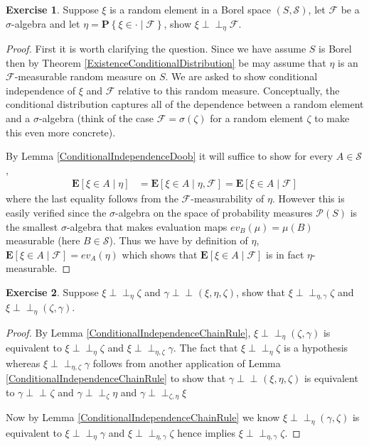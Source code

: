 \documentclass{amsbook}
\theoremstyle{definition}
\newtheorem{xca}{Exercise}
\theoremstyle{remark}
\newcommand{\Independent}{\perp \! \! \! \perp}
\newcommand{\cindependent}[3]{#1 \Independent_{#3} #2}
\newcommand{\cexpectationlong}[2]{\textbf{E}\left[ #2 \mid #1 \right]}
\newcommand{\cprobability}[2]{\textbf{P} \left \{#2 \mid #1 \right \}}
\begin{document}
\begin{xca}Suppose $\xi$ is a random element in a Borel space $(S, \mathcal{S})$, let
  $\mathcal{F}$ be a $\sigma$-algebra and let $\eta =
  \cprobability{\mathcal{F}}{\xi \in \cdot}$, show $\cindependent{\xi}{\mathcal{F}}{\eta}$.
\end{xca}
\begin{proof}
First it is worth clarifying the question.  Since we have assume $S$
is Borel then by Theorem \ref{ExistenceConditionalDistribution} be may
assume that $\eta$ is an $\mathcal{F}$-measurable random measure on
$S$.  We are asked to show conditional independence of $\xi$ and
$\mathcal{F}$ relative to this random measure.  Conceptually, the
conditional distribution captures all of the dependence between a
random element and a $\sigma$-algebra (think of the case $\mathcal{F}
= \sigma(\zeta)$ for a random element $\zeta$ to make this even more concrete).  

By Lemma \ref{ConditionalIndependenceDoob} it will suffice to show for
every $A \in \mathcal{S}$, 
\begin{align*}
\cexpectationlong{\eta}{\xi \in  A} 
&= \cexpectationlong{\eta,\mathcal{F}}{\xi \in  A} 
= \cexpectationlong{\mathcal{F}}{\xi \in  A} 
\end{align*}
where the last equality follows from the $\mathcal{F}$-measurability
of $\eta$.  However this is easily verified since the $\sigma$-algebra
on the space of probability measures $\mathcal{P}(S)$ is the smallest $\sigma$-algebra that makes
evaluation maps $ev_B(\mu) = \mu(B)$ measurable (here $B \in \mathcal{S}$).  Thus we have by
definition of $\eta$, $\cexpectationlong{\mathcal{F}}{\xi \in  A} =
ev_A(\eta)$ which shows that $\cexpectationlong{\mathcal{F}}{\xi \in
  A}$ is in fact $\eta$-measurable.
\end{proof}

\begin{xca}Suppose $\cindependent{\xi}{\zeta}{\eta}$ and
  $\cindependent{\gamma}{(\xi,\eta, \zeta)}{}$, show that
  $\cindependent{\xi}{\zeta}{\eta,\gamma}$ and $\cindependent{\xi}{(\zeta,\gamma)}{\eta}$.
\end{xca}
\begin{proof}
By Lemma \ref{ConditionalIndependenceChainRule},
$\cindependent{\xi}{(\zeta,\gamma)}{\eta}$ is equivalent to
$\cindependent{\xi}{\zeta}{\eta}$ and
$\cindependent{\xi}{\gamma}{\eta, \zeta}$.  The fact that
$\cindependent{\xi}{\zeta}{\eta}$ is a hypothesis whereas
$\cindependent{\xi}{\gamma}{\eta, \zeta}$ follows from another
application of Lemma \ref{ConditionalIndependenceChainRule} to show
that $\cindependent{\gamma}{(\xi,\eta, \zeta)}{}$ is equivalent to
$\cindependent{\gamma}{\zeta}{}$ and
$\cindependent{\gamma}{\eta}{\zeta}$ and
$\cindependent{\gamma}{\xi}{\zeta, \eta}$

Now by Lemma \ref{ConditionalIndependenceChainRule} 
we know $\cindependent{\xi}{(\gamma, \zeta)}{\eta}$ is equivalent to
$\cindependent{\xi}{\gamma}{\eta}$ and
$\cindependent{\xi}{\zeta}{\eta, \gamma}$
hence implies $\cindependent{\xi}{\zeta}{\eta, \gamma}$.
\end{proof}
\end{document}

